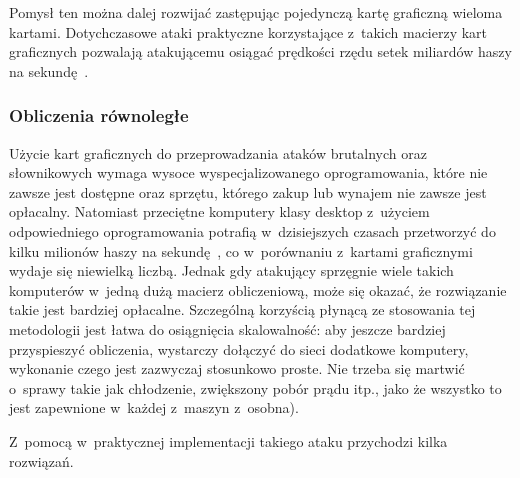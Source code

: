 Pomysł ten można dalej rozwijać zastępując pojedynczą kartę graficzną wieloma
kartami. Dotychczasowe ataki praktyczne korzystające z~takich macierzy kart
graficznych pozwalają atakującemu osiągać prędkości rzędu setek miliardów haszy
na sekundę~\cite{gpu_cracking_parallel}.



\subsubsection{Obliczenia równoległe}

Użycie kart graficznych do przeprowadzania ataków brutalnych oraz słownikowych
wymaga wysoce wyspecjalizowanego oprogramowania, które nie zawsze jest dostępne
oraz sprzętu, którego zakup lub wynajem nie zawsze jest opłacalny. Natomiast
przeciętne komputery klasy desktop z~użyciem odpowiedniego oprogramowania
potrafią w~dzisiejszych czasach przetworzyć do kilku milionów haszy na
sekundę~\cite{oclhashcat,john_the_ripper_benchmarks}, co w~porównaniu z~kartami
graficznymi wydaje się niewielką liczbą. Jednak gdy atakujący sprzęgnie wiele
takich komputerów w~jedną dużą macierz obliczeniową, może się okazać, że
rozwiązanie takie jest bardziej opłacalne. Szczególną korzyścią płynącą ze
stosowania tej metodologii jest łatwa do osiągnięcia skalowalność: aby jeszcze
bardziej przyspieszyć obliczenia, wystarczy dołączyć do sieci dodatkowe
komputery, wykonanie czego jest zazwyczaj stosunkowo proste. Nie trzeba się
martwić o~sprawy takie jak chłodzenie, zwiększony pobór prądu itp., jako że
wszystko to jest zapewnione w~każdej z~maszyn z~osobna).

Z~pomocą w~praktycznej implementacji takiego ataku przychodzi kilka rozwiązań.

